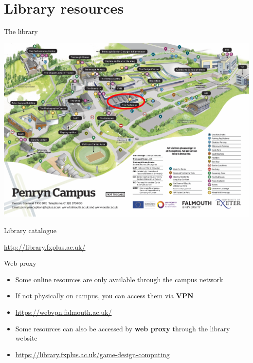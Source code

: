 \part{Library resources}
\frame{\partpage}

\begin{frame}{The library}
	\begin{center}
		\includegraphics[height=0.7\textheight]{campus_map}
	\end{center}
\end{frame}

\begin{frame}{Library catalogue}
	\begin{center}
		\url{http://library.fxplus.ac.uk/}
	\end{center}
\end{frame}

\begin{frame}{Web proxy}
    \begin{itemize}
        \pause\item Some online resources are only available through the campus network
        \pause\item If not physically on campus, you can access them via \textbf{VPN}
        \pause\item \url{https://webvpn.falmouth.ac.uk/}
        \pause\item Some resources can also be accessed by \textbf{web proxy} through the library website
        \pause\item \url{https://library.fxplus.ac.uk/game-design-computing}
	\end{itemize}
\end{frame}

